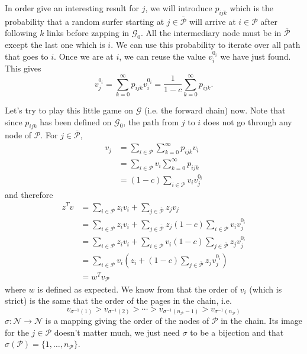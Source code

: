 \documentclass{article}
\newcommand{\1}{\mathbf{1}}
\theoremstyle{definition}
\begin{document}
In order give an interesting result for $j$, we will introduce \(p_{ijk}\) which is the probability that a random surfer starting at \(j \in \overline{\mathcal{P}}\)
will arrive at \(i \in \mathcal{P}\) after following \(k\) links before zapping in \(\mathcal{G}_0\).
All the intermediary node must be in \(\overline{\mathcal{P}}\) except the last one which is \(i\).
We can use this probability to iterate over all path that goes to \(i\).
Once we are at $i$, we can reuse the value \(v_i^{0_i}\) we have just found.
This gives
\[ v_j^{0_i} = \sum_{k=0}^\infty p_{ijk} v_i^{0_i} = \frac{1}{1-c} \sum_{k=0}^\infty p_{ijk}. \]

Let's try to play this little game on \(\mathcal{G}\) (i.e. the forward chain) now.
Note that since $p_{ijk}$ has been defined on $\mathcal{G}_0$, the path from $j$ to $i$ does not go through any node of $\mathcal{P}$.
For \(j \in \overline{\mathcal{P}}\),
\begin{align*}
  v_j & = \sum_{i \in \mathcal{P}} \sum_{k = 0}^\infty p_{ijk} v_i\\
      & = \sum_{i \in \mathcal{P}} v_i \sum_{k = 0}^\infty p_{ijk}\\
      & = (1-c) \sum_{i \in \mathcal{P}} v_i v_j^{0_i}
\end{align*}
and therefore
\begin{align*}
  z^T v
  & = \sum_{i \in \mathcal{P}} z_i v_i + \sum_{j \in \overline{\mathcal{P}}} z_j v_j\\
  & = \sum_{i \in \mathcal{P}} z_i v_i + \sum_{j \in \overline{\mathcal{P}}} z_j (1-c) \sum_{i \in \mathcal{P}} v_i v_j^{0_i}\\
  & = \sum_{i \in \mathcal{P}} z_i v_i + \sum_{i \in \mathcal{P}} v_i (1-c) \sum_{j \in \overline{\mathcal{P}}} z_j v_j^{0_i}\\
  & = \sum_{i \in \mathcal{P}} v_i \left(z_i + (1-c) \sum_{j \in \overline{\mathcal{P}}} z_jv_j^{0_i}\right)\\
  & = w^T v_\mathcal{P}
\end{align*}
where \(w\) is defined as expected.
We know from \cite{de2008maximizing} that the order of \(v_i\) (which is strict) is the same that
the order of the pages in the chain, i.e.
\[ v_{\sigma^{-1}(1)} > v_{\sigma^{-1}(2)} > \cdots > v_{\sigma^{-1}(n_\mathcal{P}-1)} > v_{\sigma^{-1}(n_\mathcal{P})} \]
\(\sigma : \mathcal{N} \to \mathcal{N}\) is a mapping giving the order of the nodes of $\mathcal{P}$ in the chain.
Its image for the $j \in \mathcal{P}$ doesn't matter much,
we just need $\sigma$ to be a bijection and that \(\sigma(\mathcal{P}) = \{1, \ldots, n_\mathcal{P}\}\).
\end{document}
